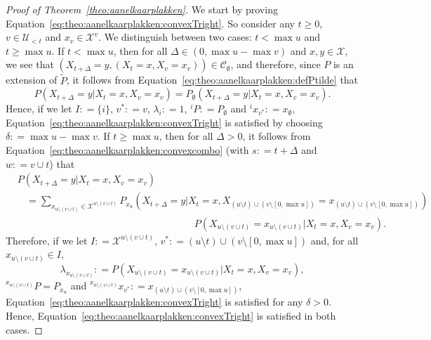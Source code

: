 \documentclass[10pt]{paper}
\theoremstyle{definition}
\newcommand{\states}{\mathcal{X}}
\newcommand{\coloneqq}{:\!=}
\begin{document}
\begin{proof}[Proof of Theorem~\ref{theo:aanelkaarplakken}]
We start by proving Equation~\eqref{eq:theo:aanelkaarplakken:convexTright}. So consider any $t\geq0$, $v\in\mathcal{U}_{<t}$ and $x_v\in\states^v$.
We distinguish between two cases: $t<\max u$ and $t\geq\max u$. If $t<\max u$, then for all $\Delta\in(0,\max u-\max v)$ and $x,y\in\states$, we see that $(X_{t+\Delta}=y,(X_t=x, X_v=x_v))\in\mathcal{C}_\emptyset$, and therefore, since $P$ is an extension of $\tilde{P}$, it follows from Equation~\eqref{eq:theo:aanelkaarplakken:defPtilde} that
\begin{equation*}
P(X_{t+\Delta}=y\vert X_t=x, X_v=x_v)
=P_\emptyset(X_{t+\Delta}=y\vert X_t=x, X_v=x_v).
\end{equation*}
Hence, if we let $I\coloneqq\{i\}$, $v^*\coloneqq v$, $\lambda_i\coloneqq 1$, ${}^iP\coloneqq P_\emptyset$ and ${}^ix_{v^*}\coloneqq x_\emptyset$, Equation~\eqref{eq:theo:aanelkaarplakken:convexTright} is satisfied by choosing $\delta\coloneqq \max u-\max v$.
If $t\geq \max u$, then for all $\Delta>0$, it follows from Equation~\eqref{eq:theo:aanelkaarplakken:convexcombo} (with $s\coloneqq t+\Delta$ and $w\coloneqq v\cup t$) that
\begin{align*}
&P(X_{t+\Delta}=y\vert X_t=x, X_v=x_v)\\
&~~~~=
\sum_{x_{u\setminus(v\cup t)}\in\states^{u\setminus(v\cup t)}}
P_{x_u}(X_{t+\Delta}=y\vert X_t=x, 
X_{(u\setminus t)\cup(v\setminus [0,\max u])}= 
x_{(u\setminus t)\cup(v\setminus [0,\max u])})\\[-4mm]
&\quad\quad\quad\quad\quad\quad\quad\quad\quad\quad\quad\quad\quad\quad\quad\quad\quad\quad
P(X_{u\setminus(v\cup t)}=x_{u\setminus(v\cup t)}
\vert X_t=x, X_v=x_v).
\end{align*}
Therefore, if we let $I\coloneqq\states^{u\setminus(v\cup t)}$, $v^*\coloneqq (u\setminus t)\cup(v\setminus [0,\max u])$ and, for all $x_{u\setminus(v\cup t)}\in I$,
\begin{equation*}
\lambda_{x_{u\setminus(v\cup t)}}
\coloneqq P(X_{u\setminus(v\cup t)}=x_{u\setminus(v\cup t)}
\vert X_t=x, X_v=x_v),
\end{equation*}
${}^{x_{u\setminus(v\cup t)}}P=P_{x_u}$ and ${}^{x_{u\setminus(v\cup t)}}x_{v^*}\coloneqq
x_{(u\setminus t)\cup(v\setminus [0,\max u])}$, Equation~\eqref{eq:theo:aanelkaarplakken:convexTright} is satisfied for any $\delta>0$.
Hence, Equation~\eqref{eq:theo:aanelkaarplakken:convexTright} is satisfied in both cases.


\end{proof}
\end{document}
